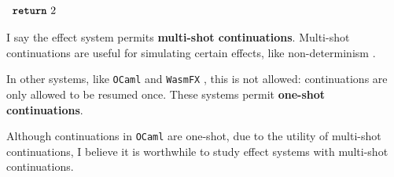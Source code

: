 \begin{enumerate}
\begin{efflst}
          \textcolor{effComment}{$\begin{array}{l}\texttt{\textbf{return}} \,\, {2}\end{array}$}
        \end{efflst}
        
        I say the effect system permits \textbf{multi-shot continuations}. Multi-shot continuations are useful for simulating certain effects, like non-determinism \citep{phipps-costin-2023}. 

        In other systems, like \texttt{OCaml} and \texttt{WasmFX} \citep{phipps-costin-2023}, this is not allowed: continuations are only allowed to be resumed once. These systems permit \textbf{one-shot continuations}. 

        Although continuations in \texttt{OCaml} are one-shot, due to the utility of multi-shot continuations, I believe it is worthwhile to study effect systems with multi-shot continuations.
\end{enumerate}
